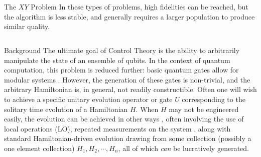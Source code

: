 \documentclass[12pt]{beamer}
\renewcommand{\maketitle}{%
	\begin{center}%
		\Huge\inserttitle\\[5mm]%
		\Large\insertauthor\\[5mm]%
		\Large\insertinstitute%
	\end{center}%
	\vspace*{-1.5ex}%
}
\begin{document}
\begin{frame}{\maketitle}
\begin{columns}
\begin{column}{.45\textwidth}
\begin{exampleblock}{The $XY$ Problem}
	In these types of problems, high fidelities can be reached, but the algorithm is less stable, and generally requires a larger population to produce similar quality. 
	\end{exampleblock}


%

%

		\end{column}
	

	
		\end{columns}
	\end{frame}

	\begin{frame}
		\begin{columns}
			\begin{column}{.45\textwidth}
				\begin{block}{Background}
					The ultimate goal of Control Theory is the ability to arbitrarily manipulate the state of an ensemble of qubits. In the context of quantum computation, this problem is reduced further: basic quantum gates allow for modular systems \cite{bremner}. However, the generation of these gates is non-trivial, and the arbitrary Hamiltonian is, in general, not readily constructible. Often one will wish to achieve a specific unitary evolution operator or gate $U$ corresponding to the solitary time evolution of a Hamiltonian $H$. When $H$ may not be engineered easily, the evolution can be achieved in other ways \cite{bremner} , often involving the use of local operations (LO), repeated measurements on the system \cite{bennett}, along with standard Hamiltonian-driven evolution drawing from some collection (possibly a one element collection) $H_1, H_2, \cdots, H_n$, all of which \emph{can} be lucratively generated.


\end{block}
\end{column}
\end{columns}
\end{frame}
\end{document}
